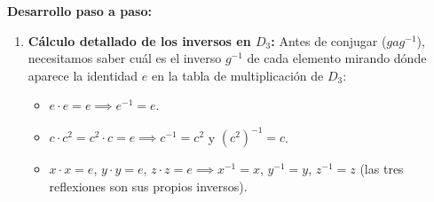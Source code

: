\documentclass[11pt, a4paper]{article}
\begin{document}
\textbf{Desarrollo paso a paso:}
\begin{enumerate}
    \item \textbf{Cálculo detallado de los inversos en $D_3$:}
    Antes de conjugar ($gag^{-1}$), necesitamos saber cuál es el inverso $g^{-1}$ de cada elemento mirando dónde aparece la identidad $e$ en la tabla de multiplicación de $D_3$:
    \begin{itemize}
        \item $e \cdot e = e \implies e^{-1} = e$.
        \item $c \cdot c^2 = c^2 \cdot c = e \implies c^{-1} = c^2$ y $(c^2)^{-1} = c$.
        \item $x \cdot x = e$, $y \cdot y = e$, $z \cdot z = e \implies x^{-1} = x$, $y^{-1} = y$, $z^{-1} = z$ (las tres reflexiones son sus propios inversos).
    \end{itemize}


\end{enumerate}
\end{document}
